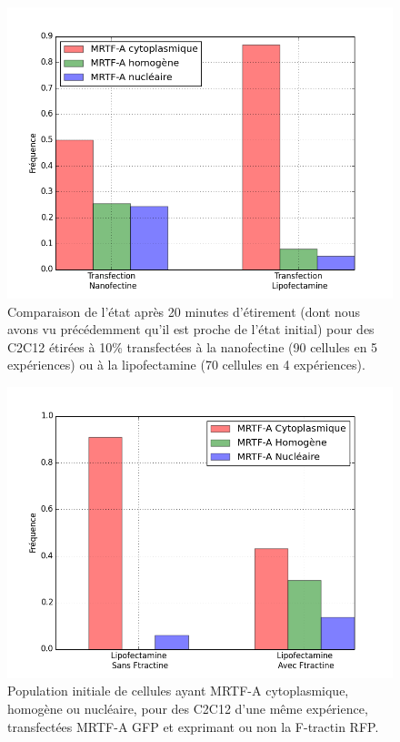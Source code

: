 \documentclass                                                                                                                                                                                                                                                                                                                                       {report}
\begin{document}
 \begin{figure}[p]
\includegraphics[scale=0.5]{Figures/Lipo_vs_Nano.png}
\caption{Comparaison de l'état après 20 minutes d'étirement (dont nous avons vu précédemment qu'il est proche de l'état initial) pour des C2C12 étirées à 10\% transfectées à la nanofectine (90 cellules en 5 expériences) ou à la lipofectamine (70 cellules en 4 expériences).  \label{LipoNano}}
\end{figure}

\begin{figure}[p]
\includegraphics[scale=0.4]{Figures/Ftractine.png} 
\caption{Population initiale de cellules ayant MRTF-A cytoplasmique, homogène ou nucléaire, pour des C2C12 d'une même expérience, transfectées MRTF-A GFP et exprimant ou non la F-tractin RFP. \label{Ftractin}}
\end{figure}
\clearpage
\end{document}
